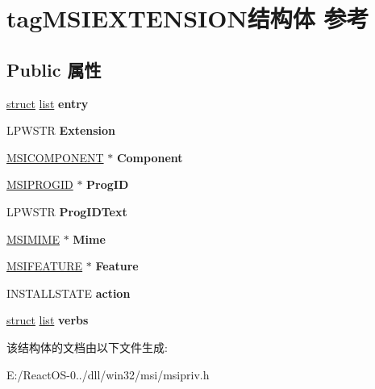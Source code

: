 \hypertarget{structtag_m_s_i_e_x_t_e_n_s_i_o_n}{}\section{tag\+M\+S\+I\+E\+X\+T\+E\+N\+S\+I\+O\+N结构体 参考}
\label{structtag_m_s_i_e_x_t_e_n_s_i_o_n}
\subsection*{Public 属性}
\begin{DoxyCompactItemize}
\item 
\mbox{\label{structtag_m_s_i_e_x_t_e_n_s_i_o_n_aee2a74d0c97f5bf7556bc82268328990}} 
\hyperlink{interfacestruct}{struct} \hyperlink{classlist}{list} {\bfseries entry}
\item 
\mbox{\label{structtag_m_s_i_e_x_t_e_n_s_i_o_n_a92e1a7b430d90055c8403a876ec5aebe}} 
L\+P\+W\+S\+TR {\bfseries Extension}
\item 
\mbox{\label{structtag_m_s_i_e_x_t_e_n_s_i_o_n_a62a582c2b339f6bb9e4cade21dee1ecd}} 
\hyperlink{structtag_m_s_i_c_o_m_p_o_n_e_n_t}{M\+S\+I\+C\+O\+M\+P\+O\+N\+E\+NT} $\ast$ {\bfseries Component}
\item 
\mbox{\label{structtag_m_s_i_e_x_t_e_n_s_i_o_n_a8300c44684250254f4ab672c8a917550}} 
\hyperlink{structtag_m_s_i_p_r_o_g_i_d}{M\+S\+I\+P\+R\+O\+G\+ID} $\ast$ {\bfseries Prog\+ID}
\item 
\mbox{\label{structtag_m_s_i_e_x_t_e_n_s_i_o_n_adf3b98a7a3b5b7d160aa6688f2e64d07}} 
L\+P\+W\+S\+TR {\bfseries Prog\+I\+D\+Text}
\item 
\mbox{\label{structtag_m_s_i_e_x_t_e_n_s_i_o_n_aa2c5e32aed546b9746e697828caa5674}} 
\hyperlink{structtag_m_s_i_m_i_m_e}{M\+S\+I\+M\+I\+ME} $\ast$ {\bfseries Mime}
\item 
\mbox{\label{structtag_m_s_i_e_x_t_e_n_s_i_o_n_ac11baaee989f78283acf193689969480}} 
\hyperlink{structtag_m_s_i_f_e_a_t_u_r_e}{M\+S\+I\+F\+E\+A\+T\+U\+RE} $\ast$ {\bfseries Feature}
\item 
\mbox{\label{structtag_m_s_i_e_x_t_e_n_s_i_o_n_a53f1356b545fcc45a67b64361a583e41}} 
I\+N\+S\+T\+A\+L\+L\+S\+T\+A\+TE {\bfseries action}
\item 
\mbox{\label{structtag_m_s_i_e_x_t_e_n_s_i_o_n_a379ea31ac3d5ccf2b65efa9cdd95ee50}} 
\hyperlink{interfacestruct}{struct} \hyperlink{classlist}{list} {\bfseries verbs}
\end{DoxyCompactItemize}


该结构体的文档由以下文件生成\+:\begin{DoxyCompactItemize}
\item 
E\+:/\+React\+O\+S-\/0../dll/win32/msi/msipriv.\+h\end{DoxyCompactItemize}
